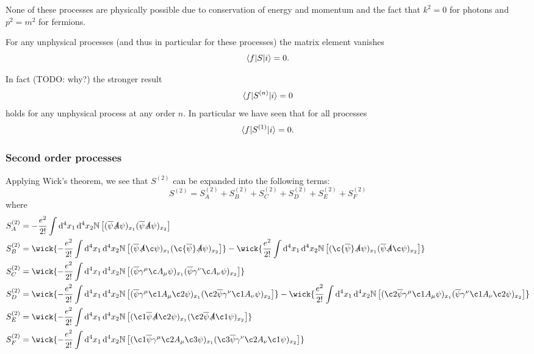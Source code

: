 None of these processes are physically possible due to conservation of energy and momentum and the fact that $k^2 = 0$ for photons and $p^2 = m^2$ for fermions.

For any unphysical processes (and thus in particular for these processes) the matrix element vanishes
\[ \braket[S]{f}{i} = 0. \]

In fact (TODO: why?) the stronger result
\[ \braket[S^{(n)}]{f}{i} = 0 \]
holds for any unphysical process at any order $n$. In particular we have seen that for all processes
\[ \braket[S^{(1)}]{f}{i} = 0. \]

\subsubsection{Second order processes}
Applying Wick's theorem, we see that $S^{(2)}$ can be expanded into the following terms:
\[ S^{(2)} = S^{(2)}_A + S^{(2)}_B + S^{(2)}_C + S^{(2)}_D + S^{(2)}_E + S^{(2)}_F \]
where
\begin{align*}
S^{(2)}_A &= -\frac{e^2}{2!}\int \diff{^4x_1}\diff{^4x_2} \N \left[(\overline{\psi}\slashed{A}\psi)_{x_1}(\overline{\psi}\slashed{A}\psi)_{x_2}\right] \\
S^{(2)}_B &= \wick{-\frac{e^2}{2!}\int \diff{^4x_1}\diff{^4x_2} \N \left[(\overline{\psi}\slashed{A}\c\psi)_{x_1}(\c{\overline{\psi}}\slashed{A}\psi)_{x_2}\right]} - \wick{ \frac{e^2}{2!}\int \diff{^4x_1}\diff{^4x_2} \N \left[(\c{\overline{\psi}}\slashed{A}\psi)_{x_1}(\overline{\psi}\slashed{A}\c\psi)_{x_2}\right]} \\
S^{(2)}_C &= \wick{-\frac{e^2}{2!}\int \diff{^4x_1}\diff{^4x_2} \N \left[(\overline{\psi}\gamma^\mu \c A_\mu\psi)_{x_1}(\overline{\psi}\gamma^\nu \c A_\nu\psi)_{x_2}\right]} \\
S^{(2)}_D &= \wick{-\frac{e^2}{2!}\int \diff{^4x_1}\diff{^4x_2} \N \left[(\overline{\psi}\gamma^\mu \c1A_\mu\c2\psi)_{x_1}(\c2{\overline{\psi}}\gamma^{\nu}\c1 A_\nu\psi)_{x_2}\right]} - \wick{\frac{e^2}{2!}\int \diff{^4x_1}\diff{^4x_2} \N \left[(\c2{\overline{\psi}}\gamma^\mu \c1A_\mu\psi)_{x_1}(\overline{\psi}\gamma^{\nu}\c1 A_\nu\c2\psi)_{x_2}\right]} \\
S^{(2)}_E &= \wick{-\frac{e^2}{2!}\int \diff{^4x_1}\diff{^4x_2} \N \left[(\c1{\overline{\psi}}\slashed{A}\c2\psi)_{x_1}(\c2{\overline{\psi}}\slashed{A}\c1\psi)_{x_2}\right]} \\
S^{(2)}_F &= \wick{-\frac{e^2}{2!}\int \diff{^4x_1}\diff{^4x_2} \N \left[(\c1{\overline{\psi}}\gamma^\mu \c2A_\mu\c3\psi)_{x_1}(\c3{\overline{\psi}}\gamma^{\nu}\c2 A_\nu\c1\psi)_{x_2}\right]}
\end{align*}

